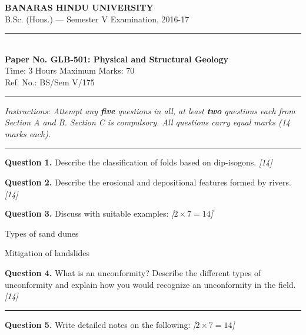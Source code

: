 \documentclass[11pt,a4paper]{article}
\newcommand{\pts}[1]{\hfill   \textit{[#1]}}
\begin{document}
\begin{center}
  {\large\bfseries BANARAS HINDU UNIVERSITY}\\[2pt]
  {\normalsize B.Sc. (Hons.) --- Semester V Examination, 2016-17}\\[6pt]
  \rule{0.8\linewidth}{0.5pt}\\[6pt]
  {\large\bfseries Paper No. GLB-501: Physical and Structural Geology}\\[4pt]
  {\normalsize Time: 3 Hours \hfill Maximum Marks: 70}\\[2pt]
  {\small Ref. No.: BS/Sem V/175}
\end{center}
\rule{\linewidth}{0.4pt}
\smallskip



\noindent   \textit{Instructions: Attempt any   \textbf{five} questions in all, at least   \textbf{two} questions each from Section A and B. Section C is compulsory. All questions carry equal marks (14 marks each).}
\bigskip

\bigskip


\rule{\linewidth}{0.4pt}\smallskip




\noindent   \textbf{Question 1.} Describe the classification of folds based on dip-isogons. \pts{14}

\medskip


\noindent   \textbf{Question 2.} Describe the erosional and depositional features formed by rivers. \pts{14}

\medskip


\noindent   \textbf{Question 3.} Discuss with suitable examples: \pts{$2  \times 7 = 14$}

\begin{parts}
  \item Types of sand dunes
  \item Mitigation of landslides
\end{parts}

\medskip


\noindent   \textbf{Question 4.} What is an unconformity? Describe the different types of unconformity and explain how you would recognize an unconformity in the field. \pts{14}

\bigskip


\rule{\linewidth}{0.4pt}\smallskip




\noindent   \textbf{Question 5.} Write detailed notes on the following: \pts{$2  \times 7 = 14$}
\end{document}
